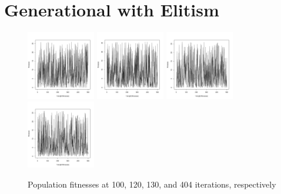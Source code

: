 \documentclass[12pt]{article}
\begin{document}
\section{Generational with Elitism}
\begin{figure}[!h]
        \begin{center}
		\includegraphics[width=30mm]{images/gen_elite/ind_101.pdf}
		\includegraphics[width=30mm]{images/gen_elite/ind_120.pdf}
		\includegraphics[width=30mm]{images/gen_elite/ind_130.pdf}
		\includegraphics[width=30mm]{images/gen_elite/ind_404.pdf}
               	\caption{Population fitnesses at 100, 120, 130, and 404 iterations, respectively}
                \label{ss_pop_fit}
        \end{center}
\end{figure}
\end{document}
